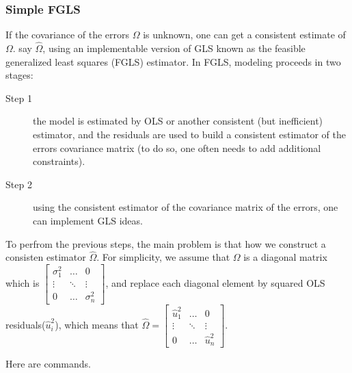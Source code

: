 \documentclass[
  12pt,
]{article}
\begin{document}
\hypertarget{simple-fgls}{%
\subsubsection{Simple FGLS}\label{simple-fgls}}

If the covariance of the errors \(\Omega\) is unknown, one can get a consistent estimate of \(\Omega\). say \(\hat{\Omega}\), using an implementable version of GLS known as the feasible generalized least squares (FGLS) estimator. In FGLS, modeling proceeds in two stages:

\begin{description}
\item[Step 1] the model is estimated by OLS or another consistent (but inefficient) estimator, and the residuals are used to build a consistent estimator of the errors covariance matrix (to do so, one often needs to add additional constraints).
\item[Step 2] using the consistent estimator of the covariance matrix of the errors, one can implement GLS ideas.
\end{description}

To perfrom the previous steps, the main problem is that how we construct a consisten estimator \(\hat{\Omega}\). For simplicity, we assume that \(\Omega\) is a diagonal matrix which is \(\begin{bmatrix} \sigma_1^2 & \dots & 0 \\ \vdots & \ddots & \vdots \\ 0 & \dots & \sigma_n^2 \end{bmatrix}\), and replace each diagonal element by squared OLS residuals(\(\hat{u}_i^2\)), which means that \(\hat{\Omega} = \begin{bmatrix} \hat{u}_1^2 & \dots & 0 \\ \vdots & \ddots & \vdots \\ 0 & \dots & \hat{u}_n^2 \end{bmatrix}\).

Here are commands.
\end{document}
